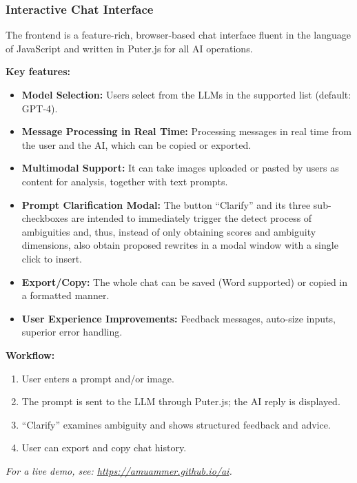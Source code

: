 \documentclass[11pt,a4paper]{article}
\begin{document}
\subsubsection{Interactive Chat Interface}
The frontend is a feature-rich, browser-based chat interface fluent in the language of JavaScript and written in Puter.js for all AI operations.

\textbf{Key features:}
\begin{itemize}
    \item \textbf{Model Selection:} Users select from the LLMs in the supported list (default: GPT-4).
    \item \textbf{Message Processing in Real Time:} Processing messages in real time from the user and the AI, which can be copied or exported.
    \item \textbf{Multimodal Support:} It can take images uploaded or pasted by users as content for analysis, together with text prompts.
    \item \textbf{Prompt Clarification Modal:} The button “Clarify” and its three sub-checkboxes are intended to immediately trigger the detect process of ambiguities and, thus, instead of only obtaining scores and ambiguity dimensions, also obtain proposed rewrites in a modal window with a single click to insert.
    \item \textbf{Export/Copy:} The whole chat can be saved (Word supported) or copied in a formatted manner.
    \item \textbf{User Experience Improvements:} Feedback messages, auto-size inputs, superior error handling.
\end{itemize}

\textbf{Workflow:}
\begin{enumerate}
    \item User enters a prompt and/or image.
    \item The prompt is sent to the LLM through Puter.js; the AI reply is displayed.
    \item “Clarify” examines ambiguity and shows structured feedback and advice.
    \item User can export and copy chat history.
\end{enumerate}

\textit{For a live demo, see: \url{https://amuammer.github.io/ai}.}
\end{document}
